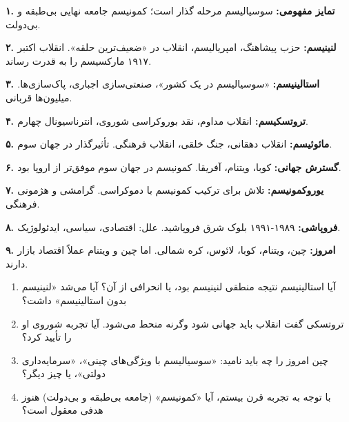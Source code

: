\begin{summarybox}

\textbf{۱. تمایز مفهومی:} سوسیالیسم مرحله گذار است؛ کمونیسم جامعه نهایی بی‌طبقه و بی‌دولت.

\textbf{۲. لنینیسم:} حزب پیشاهنگ، امپریالیسم، انقلاب در «ضعیف‌ترین حلقه». انقلاب اکتبر ۱۹۱۷ مارکسیسم را به قدرت رساند.

\textbf{۳. استالینیسم:} «سوسیالیسم در یک کشور»، صنعتی‌سازی اجباری، پاک‌سازی‌ها. میلیون‌ها قربانی.

\textbf{۴. تروتسکیسم:} انقلاب مداوم، نقد بوروکراسی شوروی، انترناسیونال چهارم.

\textbf{۵. مائوئیسم:} انقلاب دهقانی، جنگ خلقی، انقلاب فرهنگی. تأثیرگذار در جهان سوم.

\textbf{۶. گسترش جهانی:} کوبا، ویتنام، آفریقا. کمونیسم در جهان سوم موفق‌تر از اروپا بود.

\textbf{۷. یوروکمونیسم:} تلاش برای ترکیب کمونیسم با دموکراسی. گرامشی و هژمونی فرهنگی.

\textbf{۸. فروپاشی:} ۱۹۸۹-۱۹۹۱ بلوک شرق فروپاشید. علل: اقتصادی، سیاسی، ایدئولوژیک.

\textbf{۹. امروز:} چین، ویتنام، کوبا، لائوس، کره شمالی. اما چین و ویتنام عملاً اقتصاد بازار دارند.

\end{summarybox}

\vspace{20pt}

\begin{questionbox}

\begin{enumerate}[nosep, rightmargin=1cm]
    \item آیا استالینیسم نتیجه منطقی لنینیسم بود، یا انحرافی از آن؟ آیا می‌شد «لنینیسم بدون استالینیسم» داشت؟

    \item تروتسکی گفت انقلاب باید جهانی شود وگرنه منحط می‌شود. آیا تجربه شوروی او را تأیید کرد؟

    \item چین امروز را چه باید نامید: «سوسیالیسم با ویژگی‌های چینی»، «سرمایه‌داری دولتی»، یا چیز دیگر؟

    \item با توجه به تجربه قرن بیستم، آیا «کمونیسم» (جامعه بی‌طبقه و بی‌دولت) هنوز هدفی معقول است؟
\end{enumerate}

\end{questionbox}

